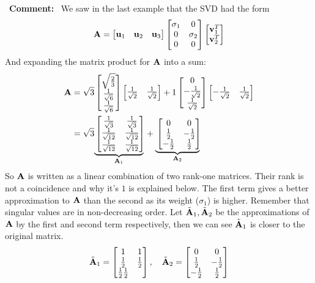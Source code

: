 \documentclass[a4paper]{article}
\numberwithin{equation}{section} %
\newcounter{example}
\newcommand{\myunderbrace}[2]{\mathrlap{\underbrace{\phantom{#1}}_{#2}}
      #1}
\newcommand{\B}[1]{\textbf{\textup{#1}}} %
\newcommand{\mycomment}[1]{\begin{leftrightbox}\Pointinghand~\textbf{Comment:}~#1 \end{leftrightbox}}
\begin{document}
\mycomment{ %
We saw in the last example that the SVD had the form
\[
\B{A}=
\begin{bmatrix}\B{u}_1 & \B{u}_2 & \B{u}_3\end{bmatrix}
\begin{bmatrix}\sigma_1 & 0\\ 0 & \sigma_2\\0 & 0 \end{bmatrix}
\begin{bmatrix}\B{v}_1^T \\ \B{v}_2^T \end{bmatrix}
\]
And expanding the matrix product for $\B{A}$ into a sum:
\[
\begin{split}
\B{A}&=
\sqrt{3}
\begin{bmatrix}\sqrt{\tfrac{2}{3}}\\\tfrac{1}{\sqrt{6}}\\\tfrac{1}{\sqrt{6}} \end{bmatrix}
\begin{bmatrix}\tfrac{1}{\sqrt{2}} & \tfrac{1}{\sqrt{2}} \end{bmatrix} + 
1
\begin{bmatrix}0 \\ -\tfrac{1}{\sqrt{2}}\\ \tfrac{1}{\sqrt{2}} \end{bmatrix}
\begin{bmatrix}-\tfrac{1}{\sqrt{2}} & \tfrac{1}{\sqrt{2}} \end{bmatrix}\\
&=\sqrt{3}
\myunderbrace{\begin{bmatrix}\tfrac{1}{\sqrt{3}} & \tfrac{1}{\sqrt{3}} \\ \tfrac{1}{\sqrt{12}} & \tfrac{1}{\sqrt{12}} \\ \tfrac{1}{\sqrt{12}} & \tfrac{1}{\sqrt{12}}\end{bmatrix} }{\B{A}_1}
+
\myunderbrace{\begin{bmatrix}0 & 0\\ \tfrac{1}{2} & -\tfrac{1}{2}\\ -\tfrac{1}{2} & \tfrac{1}{2} \end{bmatrix}}{\B{A}_2}
\end{split}
\]
So $\B{A}$ is written as a linear combination of two rank-one matrices. Their rank is not a coincidence and why it's $1$ is explained below. The first term gives a better approximation to $\B{A}$ than the second as its weight ($\sigma_1$) is higher. Remember that singular values are in non-decreasing order. Let $\tilde{\B{A}}_1,\tilde{\B{A}}_2$ be the approximations of $\B{A}$ by the first and second term respectively, then we can see $\tilde{\B{A}}_1$ is closer to the original matrix.
\[
\tilde{\B{A}}_1=\begin{bmatrix}1 & 1\\ \tfrac{1}{2} & \tfrac{1}{2}\\ \tfrac{1}{2} \tfrac{1}{2}\end{bmatrix},\quad
\tilde{\B{A}}_2=\begin{bmatrix}0 & 0\\ \tfrac{1}{2} & -\tfrac{1}{2}\\ -\tfrac{1}{2} & \tfrac{1}{2} \end{bmatrix}
\]
} %
\end{document}
